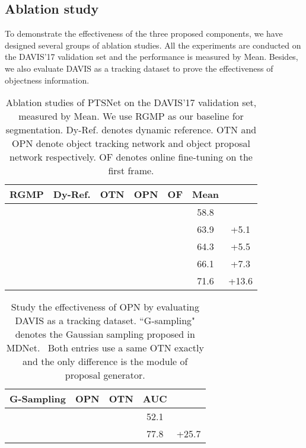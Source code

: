 \documentclass[10pt,twocolumn,letterpaper]{article}
\newcommand{\cmark}{\ding{51}}\newcommand{\xmark}{\ding{55}}
\begin{document}
\subsection{Ablation study} \label{abstudy}

To demonstrate the effectiveness of the three proposed components, we have designed several groups of ablation studies. All the experiments are conducted on the DAVIS'17 validation set and the performance is measured by  Mean. Besides, we also evaluate DAVIS as a tracking dataset to prove the effectiveness of objectness information.



    \begin{table}[!t]
\caption{Ablation studies of PTSNet on the DAVIS'17 validation set, measured by  Mean. We use RGMP as our baseline for segmentation. Dy-Ref. denotes dynamic reference. OTN and OPN denote object tracking network and object proposal network respectively. OF denotes online fine-tuning on the first frame.}
    \vspace{1mm}
      \centering
      \setlength{\tabcolsep}{1mm}
{\begin{tabular}{c c c c c | c c}
        \toprule
        RGMP        & Dy-Ref.   & OTN       & OPN       & OF        &  Mean &   \\
        \midrule
        \cmark      &           &           &           &           &   58.8   &  \\
        \cmark      & \cmark    &           &           &           &   63.9   & +5.1 \\
        \cmark      & \cmark    & \cmark    &           &           &   64.3   & +5.5 \\
        \cmark      & \cmark    & \cmark    & \cmark    &           &   66.1   & +7.3 \\
        \cmark      & \cmark    & \cmark    & \cmark    & \cmark    &   71.6   & +13.6 \\
        \bottomrule
      \end{tabular}}
      \label{table:ablationstudy}
    \end{table}
    
    \begin{table}[b]
\caption{Study the effectiveness of OPN by evaluating DAVIS as a tracking dataset. ``G-sampling" denotes the Gaussian sampling proposed in MDNet.~\cite{mdnet_cvpr16} Both entries use a same OTN exactly and the only difference is the module of proposal generator.}
    \vspace{1mm}
      \centering
      \setlength{\tabcolsep}{1mm}
{\begin{tabular}{c c c | c c}
        \toprule
        G-Sampling              & OPN       & OTN       & AUC       &   \\
        \midrule
        \cmark                  &           & \cmark    & 52.1      &           \\
                                & \cmark    & \cmark    & 77.8      &   +25.7    \\
        \bottomrule
      \end{tabular}}
      \label{table:davis_vot}
    \end{table}
\end{document}
